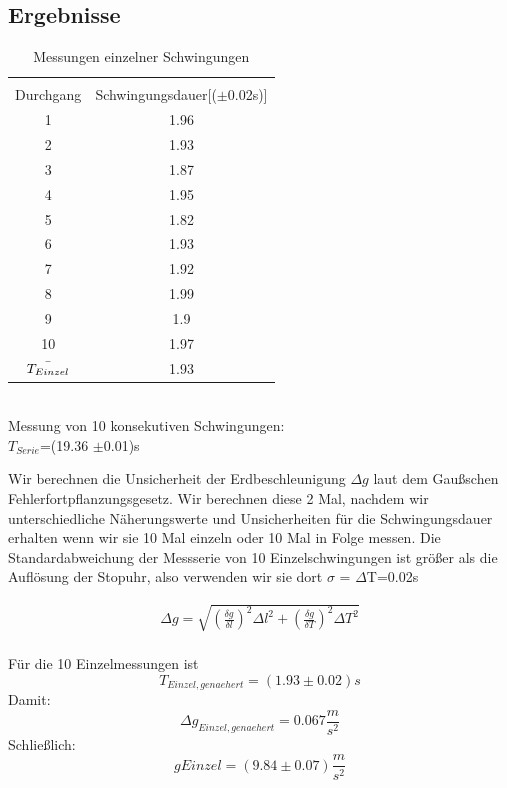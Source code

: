 \documentclass{article}
\begin{document}
\subsection{Ergebnisse}
\begin{table} [H]
\caption{Messungen einzelner Schwingungen}
\begin{center}
\begin{tabular}{|c|c|}
\hline \\
Durchgang & Schwingungsdauer[($\pm$0.02s)]\\
\hline
 1&1.96\\
2&1.93\\
3&1.87\\
4&1.95\\
5&1.82\\
 6&1.93\\
7&1.92\\
 8&1.99\\
 9&1.9\\
 10&1.97\\
\hline $\Bar{T_{Einzel}}$ & 1.93 \\
\hline


\end{tabular} \\
\vspace{1cm}
Messung von 10 konsekutiven Schwingungen:\\
\vspace{1cm}
$T_{Serie}$=(19.36 $\pm$0.01)s
\end{center}
\end{table}


Wir berechnen die Unsicherheit der Erdbeschleunigung $\Delta g$ laut dem Gaußschen Fehlerfortpflanzungsgesetz. Wir berechnen diese 2 Mal, nachdem wir unterschiedliche Näherungswerte und Unsicherheiten für die Schwingungsdauer erhalten wenn wir sie 10 Mal einzeln oder 10 Mal in Folge messen.
Die Standardabweichung der Messserie von 10 Einzelschwingungen ist größer als die Auflösung der Stopuhr, also verwenden wir sie dort $\sigma$ = $\Delta$T=0.02s

\begin{align}
\Delta g=\sqrt{(\frac{\delta g}{\delta l})^2\Delta l^2 + (\frac{\delta g}{\delta T})^2\Delta T^2}
\end{align} \\
Für die 10 Einzelmessungen ist
\begin{equation}
T_{Einzel,genaehert} = (1.93 \pm 0.02)s
\end{equation}
Damit:
\begin{equation}
\Delta g_{Einzel,genaehert} = 0.067 \frac{m}{s^2}
\end{equation}
 Schließlich:
 \begin{equation}
 g{Einzel}=(9.84\pm0.07)\frac{m}{s^2}
 \end{equation}
\end{document}
